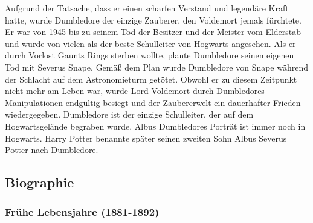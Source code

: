\documentclass[a4paper, 10pt]{article}
\begin{document}
\vspace{10pt}
\newline
{}  
Aufgrund der Tatsache, dass er einen scharfen Verstand und legendäre Kraft hatte, wurde Dumbledore der einzige Zauberer, den Voldemort jemals fürchtete. Er war von 1945 bis zu seinem Tod der Besitzer und der Meister vom Elderstab und wurde von vielen als der beste Schulleiter von Hogwarts angesehen. Als er durch Vorlost Gaunts Rings sterben wollte, plante Dumbledore seinen eigenen Tod mit Severus Snape. Gemäß dem Plan wurde Dumbledore von Snape während der Schlacht auf dem Astronomieturm getötet.
\vspace{10pt}
\newline
{}  
Obwohl er zu diesem Zeitpunkt nicht mehr am Leben war, wurde Lord Voldemort durch Dumbledores Manipulationen endgültig besiegt und der Zaubererwelt ein dauerhafter Frieden wiedergegeben. Dumbledore ist der einzige Schulleiter, der auf dem Hogwartsgelände begraben wurde. Albus Dumbledores Porträt ist immer noch in Hogwarts. Harry Potter benannte später seinen zweiten Sohn Albus Severus Potter nach Dumbledore.

\subsection*{\Large Biographie}

\subsubsection*{\large Frühe Lebensjahre (1881-1892)}
\end{document}
